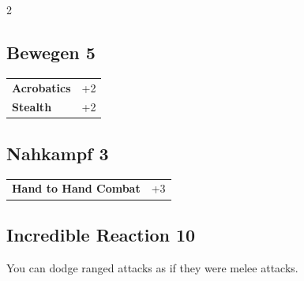 \begin{multicols}{2}
\begin{tcolorbox}
\end{tcolorbox}

\begin{tcolorbox}
    \subsection*{Bewegen \hfill \small{5 }}
    \tcblower




\begin{tabular}{@{}ll@{}}
    \textbf{Acrobatics} & +2\\
    \textbf{Stealth} & +2\\
\end{tabular}


\end{tcolorbox}

\begin{tcolorbox}
    \subsection*{Nahkampf \hfill \small{3 }}
    \tcblower




\begin{tabular}{@{}ll@{}}
    \textbf{Hand to Hand Combat} & +3\\
\end{tabular}


\end{tcolorbox}

\begin{tcolorbox}
    \subsection*{Incredible Reaction \hfill \small{10 }}
    \tcblower
You can dodge ranged attacks as if they were melee attacks.



\end{tcolorbox}
\end{multicols}
